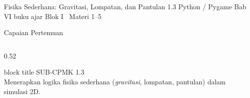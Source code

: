\documentclass[aspectratio=169,10pt]{beamer}
\begin{document}
  {Fisika Sederhana: Gravitasi, Lompatan, dan Pantulan}
  {1.3}
  {Python / Pygame}
  {Bab VI buku ajar}
  {Blok I \textperiodcentered\ Materi 1--5}

\begin{frame}{Capaian Pertemuan}
\begin{columns}[T,onlytextwidth]
  \begin{column}{0.52\textwidth}
    \begin{beamercolorbox}[wd=\linewidth,sep=5pt,rounded=true]{block title}
      {\fontsize{6.8}{8}\selectfont\color{ubHead}SUB-CPMK 1.3}\\[2pt]
      {\footnotesize Menerapkan logika fisika sederhana (\emph{gravitasi},
       lompatan, pantulan) dalam simulasi 2D.}
    \end{beamercolorbox}
    \vspace{0.16cm}


\end{column}
\end{columns}
\end{frame}
\end{document}
